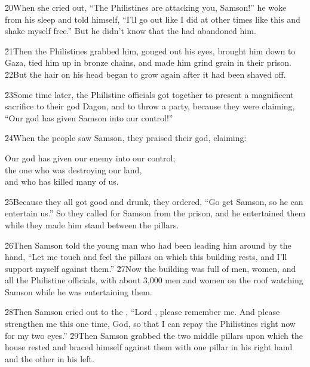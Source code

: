 \v{20}When she cried out, ``The Philistines are attacking you, Samson!'' he woke from his sleep and told himself, ``I'll go out like I did at other times like this and shake myself free.'' But he didn't know that the  had abandoned him.

\v{21}Then the Philistines grabbed him, gouged out his eyes, brought him down to Gaza, tied him up in bronze chains, and made him grind grain in their prison. \v{22}But the hair on his head began to grow again after it had been shaved off.

\v{23}Some time later, the Philistine officials got together to present a magnificent sacrifice to their god Dagon, and to throw a party, because they were claiming, ``Our god has given Samson into our control!''

\v{24}When the people saw Samson, they praised their god, claiming:

\begin{poetry}
\poeml Our god has given our enemy into our control; \\
\poemll    the one who was destroying our land, \\
\poemlll       and who has killed many of us.
\end{poetry}

\v{25}Because they all got good and drunk, they ordered, ``Go get Samson, so he can entertain us.'' So they called for Samson from the prison, and he entertained them while they made him stand between the pillars.

\v{26}Then Samson told the young man who had been leading him around by the hand, ``Let me touch and feel the pillars on which this building rests, and I'll support myself against them.'' \v{27}Now the building was full of men, women, and all the Philistine officials, with about 3,000 men and women on the roof watching Samson while he was entertaining them.

\v{28}Then Samson cried out to the , ``Lord , please remember me. And please strengthen me this one time, God, so that I can repay the Philistines right now for my two eyes.'' \v{29}Then Samson grabbed the two middle pillars upon which the house rested and braced himself against them with one pillar in his right hand and the other in his left.


